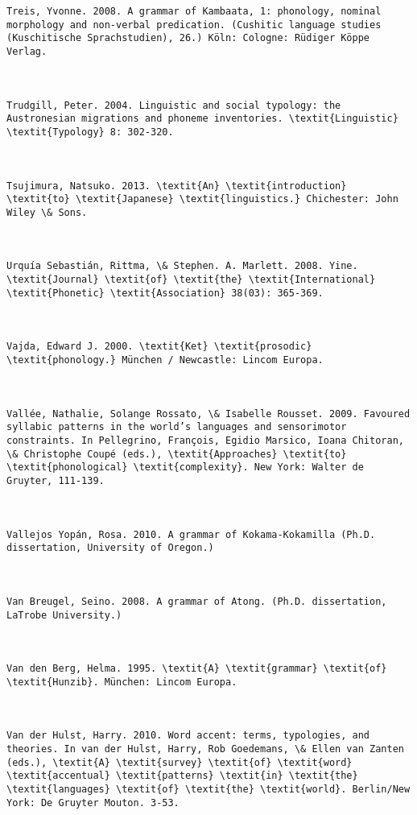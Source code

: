 \begin{verbatim}
Treis, Yvonne. 2008. A grammar of Kambaata, 1: phonology, nominal morphology and non-verbal predication. (Cushitic language studies (Kuschitische Sprachstudien), 26.) Köln: Cologne: Rüdiger Köppe Verlag.



Trudgill, Peter. 2004. Linguistic and social typology: the Austronesian migrations and phoneme inventories. \textit{Linguistic} \textit{Typology} 8: 302-320.



Tsujimura, Natsuko. 2013. \textit{An} \textit{introduction} \textit{to} \textit{Japanese} \textit{linguistics.} Chichester: John Wiley \& Sons.



Urquía Sebastián, Rittma, \& Stephen. A. Marlett. 2008. Yine. \textit{Journal} \textit{of} \textit{the} \textit{International} \textit{Phonetic} \textit{Association} 38(03): 365-369.



Vajda, Edward J. 2000. \textit{Ket} \textit{prosodic} \textit{phonology.} München / Newcastle: Lincom Europa.



Vallée, Nathalie, Solange Rossato, \& Isabelle Rousset. 2009. Favoured syllabic patterns in the world’s languages and sensorimotor constraints. In Pellegrino, François, Egidio Marsico, Ioana Chitoran, \& Christophe Coupé (eds.), \textit{Approaches} \textit{to} \textit{phonological} \textit{complexity}. New York: Walter de Gruyter, 111-139.



Vallejos Yopán, Rosa. 2010. A grammar of Kokama-Kokamilla (Ph.D. dissertation, University of Oregon.)



Van Breugel, Seino. 2008. A grammar of Atong. (Ph.D. dissertation, LaTrobe University.)



Van den Berg, Helma. 1995. \textit{A} \textit{grammar} \textit{of} \textit{Hunzib}. München: Lincom Europa.



Van der Hulst, Harry. 2010. Word accent: terms, typologies, and theories. In van der Hulst, Harry, Rob Goedemans, \& Ellen van Zanten (eds.), \textit{A} \textit{survey} \textit{of} \textit{word} \textit{accentual} \textit{patterns} \textit{in} \textit{the} \textit{languages} \textit{of} \textit{the} \textit{world}. Berlin/New York: De Gruyter Mouton. 3-53.




\end{verbatim}
